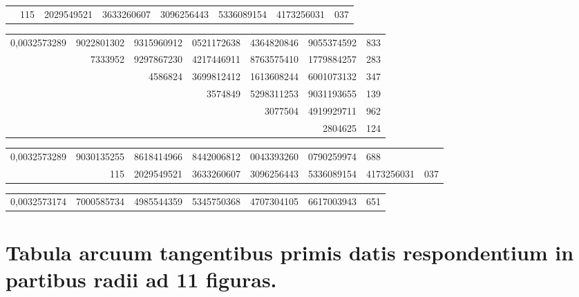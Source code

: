 \documentclass[10pt,a4paper]{article}
\begin{document}
\medskip

\begin{center}
\begin{tabular}{r r r r r r}
& 115 & 2029549521 & 3633260607 & 3096256443 & 5336089154 & 4173256031 & 037 \\
\end{tabular}
\end{center}

\medskip

\begin{center}
\begin{tabular}{r r r r r r}
0,0032573289 & 9022801302 & 9315960912 & 0521172638 & 4364820846 & 9055374592 & 833 \\
& 7333952 & 9297867230 & 4217446911 & 8763575410 & 1779884257 & 283 \\
& & 4586824 & 3699812412 & 1613608244 & 6001073132 & 347 \\
& & & 3574849 & 5298311253 & 9031193655 & 139 \\
& & & & 3077504 & 4919929711 & 962 \\
& & & & & 2804625 & 124 \\
\end{tabular}
\end{center}

\medskip

\begin{center}
\begin{tabular}{r r r r r r}
0,0032573289 & 9030135255 & 8618414966 & 8442006812 & 0043393260 & 0790259974 & 688 \\
& 115 & 2029549521 & 3633260607 & 3096256443 & 5336089154 & 4173256031 & 037 \\
\end{tabular}
\end{center}

\medskip

\begin{center}
\begin{tabular}{r r r r r r}
0,0032573174 & 7000585734 & 4985544359 & 5345750368 & 4707304105 & 6617003943 & 651 \\
\end{tabular}
\end{center}

\newpage

\section{Tabula arcuum tangentibus primis datis respondentium in partibus radii ad 11 figuras.}
\end{document}
